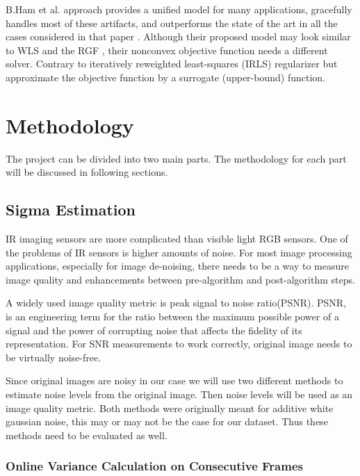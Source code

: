 \documentclass[10pt,twocolumn,letterpaper]{article}
\begin{document}
B.Ham et al. approach provides a unified model for many applications, gracefully handles most of these artifacts, and outperforms the state of the art in all the cases considered in that paper \cite{ham2015}. Although their proposed model may look similar to WLS \cite{farbman2008edge} and the RGF \cite{yan2013cross}, their nonconvex objective function needs a different solver. Contrary to iteratively reweighted least-squares (IRLS) \cite{daubechies2010iteratively} regularizer but approximate the objective function by a surrogate (upper-bound) function.


\section{Methodology}
The project can be divided into two main parts. The methodology for each part will be discussed in following sections.

\subsection{Sigma Estimation}
IR imaging sensors are more complicated than visible light RGB sensors. One of the problems of IR sensors is higher amounts of noise.
For most image processing applications, especially for image de-noising, there needs to be a way to measure image quality and enhancements between pre-algorithm and post-algorithm steps.

A widely used image quality metric is peak signal to noise ratio(PSNR). PSNR, is an engineering term for the ratio between the maximum possible power of a signal and the power of corrupting noise that affects the fidelity of its representation\cite{wiki:psnr}. For SNR measurements to work correctly, original image needs to be virtually noise-free.

Since original images are noisy in our case we will use two different methods to estimate noise levels from the original image. Then noise levels will be used as an image quality metric. Both methods were originally meant for additive white gaussian noise, this may or may not be the case for our dataset. Thus these methods need to be evaluated as well.
\subsubsection{Online Variance Calculation on Consecutive Frames} \label{ss:online-var}
\end{document}

